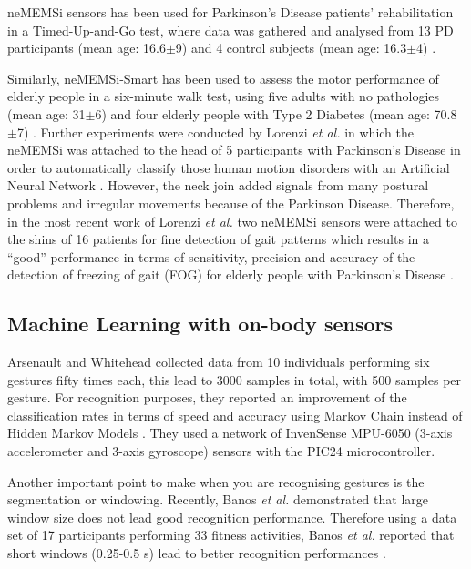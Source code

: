 \documentclass[9pt,journal,onecolumn,compsoc]{IEEEtran}
\begin{document}
neMEMSi sensors has been used for Parkinson's Disease patients' rehabilitation 
in a Timed-Up-and-Go test, where data was gathered and analysed from 
13 PD participants (mean age: 16.6$\pm$9) and 4 control subjects (mean age: 16.3$\pm$4) \cite{Caldara2014}.

Similarly, neMEMSi-Smart has been used to assess the motor performance of elderly people
in a six-minute walk test, using five adults with no pathologies (mean age: 31$\pm$6) and four elderly people with Type 2 Diabetes 
(mean age: 70.8$\pm$7) \cite{Caldara2015}.
Further experiments were conducted by Lorenzi \textit{et al.} in which the neMEMSi was attached to the head 
of 5 participants  with Parkinson's Disease in order to 
automatically classify those human motion disorders with an Artificial Neural Network \cite{Lorenzi2015}.
However, the neck join added signals from many postural problems
and irregular movements because of the Parkinson Disease.
Therefore, in the most recent work of Lorenzi \textit{et al.} two neMEMSi sensors were attached to the shins
of 16 patients for fine detection of gait patterns
which results in a ``good'' performance in terms of sensitivity, precision and accuracy of 
the detection of freezing of gait (FOG) for elderly people with Parkinson's Disease  \cite{Lorenzi2016}.

\subsection{Machine Learning with on-body sensors}

Arsenault and Whitehead collected data from 10 individuals performing six gestures fifty times each,
this lead to 3000 samples in total, with 500 samples per gesture. 
For recognition purposes, they reported an improvement of the classification rates
in terms of speed and accuracy using Markov Chain instead of Hidden Markov Models \cite{Arsenault2015_a, Arsenault2015_b}.
They used a network of InvenSense MPU-6050 (3-axis accelerometer and 3-axis gyroscope) sensors with the  PIC24 microcontroller.
  
Another important point to make when you are recognising gestures is the segmentation or windowing.
Recently, Banos \textit{et al.} 
demonstrated that large window size does not lead good recognition performance.
Therefore using a data set of 17 participants performing 33 fitness activities,
Banos \textit{et al.} reported that short windows (0.25-0.5 s) lead to better recognition performances \cite{Banos2014}. 
 
\end{document}

